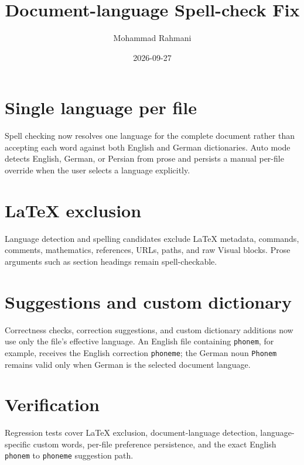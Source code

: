 \documentclass[a4paper]{article}
\title{Document-language Spell-check Fix}
\date{2026-09-27}
\author{Mohammad Rahmani}
\begin{document}
   \maketitle

   \begin{preview}
      \section{Single language per file}
      Spell checking now resolves one language for the complete document rather
      than accepting each word against both English and German dictionaries.
      Auto mode detects English, German, or Persian from prose and persists a
      manual per-file override when the user selects a language explicitly.

      \section{LaTeX exclusion}
      Language detection and spelling candidates exclude LaTeX metadata,
      commands, comments, mathematics, references, URLs, paths, and raw Visual
      blocks. Prose arguments such as section headings remain spell-checkable.

      \section{Suggestions and custom dictionary}
      Correctness checks, correction suggestions, and custom dictionary
      additions now use only the file's effective language. An English file
      containing \texttt{phonem}, for example, receives the English correction
      \texttt{phoneme}; the German noun \texttt{Phonem} remains valid only
      when German is the selected document language.

      \section{Verification}
      Regression tests cover LaTeX exclusion, document-language detection,
      language-specific custom words, per-file preference persistence, and the
      exact English \texttt{phonem} to \texttt{phoneme} suggestion path.
   \end{preview}

   
   
\end{document}
